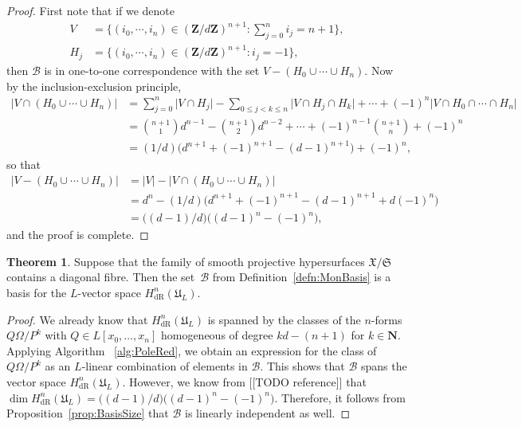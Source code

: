 \documentclass[a4paper,11pt]{article}
\numberwithin{equation}{section}
\providecommand{\abs}[1]{\lvert#1\rvert}                 %
\newcommand{\NN}{\mathbf{N}} %
\newcommand{\ZZ}{\mathbf{Z}} %
\providecommand{\HdR}{H_{\text{dR}}}    %
\providecommand{\cB}{\mathcal{B}} %
\theoremstyle{definition}
\newtheorem{thm}{Theorem}[section]
\begin{document}
\begin{proof}
First note that if we denote
\begin{align*}
V &= \{(i_0,\cdots,i_n) \in (\ZZ/d\ZZ)^{n+1} : \sum_{j=0}^n i_j = n+1\}, \\
H_j &= \{(i_0,\cdots,i_n) \in (\ZZ/d\ZZ)^{n+1} : i_j = -1 \},
\end{align*}
then  $\cB$ is in one-to-one correspondence with the set $V-(H_0 \cup \cdots \cup H_n)$. Now by the inclusion-exclusion
principle, 
\begin{align*}
\abs{V \cap (H_0 \cup \cdots \cup H_n)} &= \sum_{j=0}^n \abs{V \cap H_j} - \sum_{0 \leq j < k \leq n} \abs{V \cap H_j \cap H_k}
+ \cdots + (-1)^{n} \abs{V \cap H_0 \cap \cdots \cap H_n} \\
&= {n+1 \choose 1} d^{n-1} -{n+1 \choose 2} d^{n-2} + \cdots + (-1)^{n-1} {n+1 \choose n} + (-1)^{n} \\
&= (1/d)\bigl(d^{n+1}+(-1)^{n+1} - (d-1)^{n+1}\bigr)+(-1)^n,
\end{align*}
so that
\begin{align*}
\abs{V-(H_0 \cup \cdots \cup H_n)}&=\abs{V}-\abs{V \cap (H_0 \cup \cdots \cup H_n)} \\
&= d^n - (1/d)\bigl(d^{n+1}+(-1)^{n+1} - (d-1)^{n+1}+d (-1)^n \bigr) \\
&= \bigl((d-1)/d\bigr) \bigl((d-1)^{n} - (-1)^{n}\bigr),
\end{align*}
and the proof is complete.
\end{proof}

\begin{thm} \label{thm:Basis}
Suppose that the family of smooth projective hypersurfaces $\mathfrak{X}/\mathfrak{S}$ 
contains a diagonal fibre.  Then the set~$\cB$ from Definition~\ref{defn:MonBasis} 
is a basis for the $L$-vector space $\HdR^n(\mathfrak{U}_L)$.
\end{thm}

\begin{proof}
We already know that $\HdR^n(\mathfrak{U}_L)$ is spanned by the classes of the 
$n$-forms $Q \Omega / P^k$ with $Q \in L[x_0, \dotsc, x_n]$ homogeneous of degree 
$kd - (n+1)$ for $k \in \NN$. Applying Algorithm ~\ref{alg:PoleRed}, we obtain an 
expression for the class of $Q \Omega / P^k$ as an $L$-linear combination of 
elements in $\cB$.  This shows that $\cB$ spans the vector space 
$\HdR^n(\mathfrak{U}_L)$. However, we know from [[TODO reference]] that 
$\dim \HdR^n(\mathfrak{U}_L) = \bigl((d-1)/d\bigr) \bigl( (d-1)^n - (-1)^n \bigr)$.  
Therefore, it follows from Proposition~\ref{prop:BasisSize} that $\cB$ is linearly 
independent as well.
\end{proof}
\end{document}
